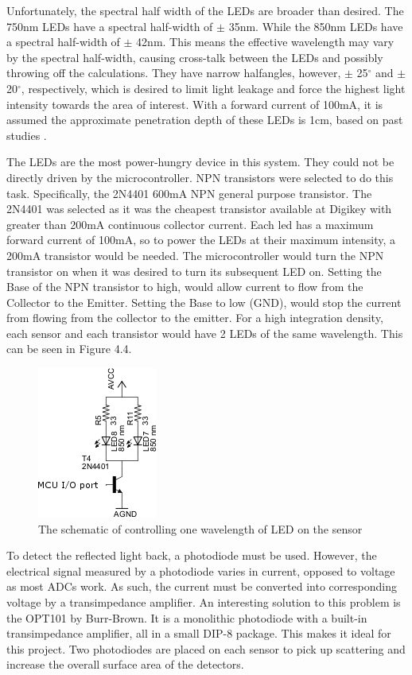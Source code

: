 Unfortunately, the spectral half width of the LEDs are broader than desired. The 750nm LEDs have a spectral half-width of $\pm$ 35nm. While the 850nm LEDs have a spectral half-width of $\pm$ 42nm. This means the effective wavelength may vary by the spectral half-width, causing cross-talk between the LEDs and possibly throwing off the calculations. They have narrow halfangles, however, $\pm$ 25$^\circ$ and $\pm$ 20$^\circ$, respectively, which is desired to limit light leakage and force the highest light intensity towards the area of interest. With a forward current of 100mA, it is assumed the approximate penetration depth of these LEDs is 1cm, based on past studies \cite{rosen05}.

The LEDs are the most power-hungry device in this system. They could not be directly driven by the microcontroller. NPN transistors were selected to do this task. Specifically, the 2N4401 600mA NPN general purpose transistor. The 2N4401 was selected as it was the cheapest transistor available at Digikey with greater than 200mA continuous collector current. Each led has a maximum forward current of 100mA, so to power the LEDs at their maximum intensity, a 200mA transistor would be needed. The microcontroller would turn the NPN transistor on when it was desired to turn its subsequent LED on. Setting the Base of the NPN transistor to high, would allow current to flow from the Collector to the Emitter. Setting the Base to low (GND), would stop the current from flowing from the collector to the emitter. For a high integration density, each sensor and each transistor would have 2 LEDs of the same wavelength. This can be seen in Figure 4.4.

\begin{figure}[htp]
\centering
\includegraphics{led.png}
\caption[LED control diagram]{The schematic of controlling one wavelength of LED on the sensor}
\end{figure}

To detect the reflected light back, a photodiode must be used. However, the electrical signal measured by a photodiode varies in current, opposed to voltage as most ADCs work. As such, the current must be converted into corresponding voltage by a transimpedance amplifier. An interesting solution to this problem is the OPT101 by Burr-Brown. It is a monolithic photodiode with a built-in transimpedance amplifier, all in a small DIP-8 package. This makes it ideal for this project. Two photodiodes are placed on each sensor to pick up scattering and increase the overall surface area of the detectors.

